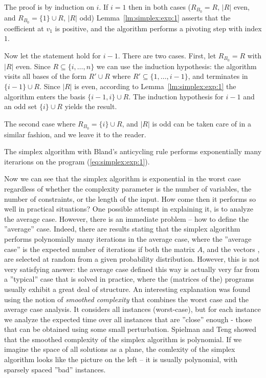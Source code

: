 \begin{dokaz}
  The proof is by induction on $i$. If $i=1$ then in both cases ($R_{B_0}=R$, $|R|$ even, 
  and  $R_{B_0}=\{1\}\cup R$, $|R|$ odd) Lemma~\ref{lm:simplex:exp:1} asserts that the coefficient
  at $v_1$ is positive, and the algorithm performs a pivoting step with index $1$.

  \noindent
  Now let the statement hold for $i-1$. There are two cases. First, let  $R_{B_0}=R$ with $|R|$ even.
  Since  $R\subseteq\{i,\ldots,n\}$ we can use the induction hypothesis: the algorithm visits all bases
  of the form $R'\cup R$ where $R'\subseteq\{1,\ldots,i-1\}$, and terminates in  $\{i-1\}\cup R$.
  Since $|R|$ is even, according to Lemma~\ref{lm:simplex:exp:1} the algorithm enters the basis
  $\{i-1,i\}\cup R$. The induction hypothesis for $i-1$ and an odd set $\{i\}\cup R$ yields the result.

  \noindent
  The second case where $R_{B_0}=\{i\}\cup R$, and $|R|$ is odd can be taken care of in a similar fashion,
  and we leave it to the reader.
\end{dokaz}

\begin{dosl}
  The simplex algorithm with Bland's anticycling rule performs exponentially many iterarions on the
  program
  (\ref{eq:simplex:exp:1}).
\end{dosl}


\noindent
Now we can see that the simplex algorithm is exponential in the worst case regardless of whether the 
complexity parameter is the number of variables, the number of constraints, or the length of the input. 
How come then it performs so well in practical situations? One possible attempt in explaining it, is to 
analyze the average case. However, there is an immediate problem -- how to define the ''average'' case.
Indeed, there are results stating that the simplex algorithm performs polynomially many iterations in the
average case, where the ''average case'' is the expected number of iterations if both the matrix $A$, and
the vectors ,  are selected at random from a given probability distribution.
However, this is not very satisfying answer: the average case defined this way is actually very far
from a ''typical'' case that is solved in practice, where the (matrices of the) programs usually exhibit
a great deal of structure. An interesting explanation was found using the notion of {\em smoothed complexity}
that combines the worst case and the average case analysis. 
It considers all instances (\ie worst-case), but for each instance we analyze the expected time over all
instances that are ''close'' enough - \ie those that can be obtained using some small perturbation. 
Spielman and Teng \cite{ST04} showed that the smoothed complexity of the simplex algorithm is polynomial.
If we  imagine the space of all solutions as a plane, the comlexity of the simplex algorithm looks like the
picture on the left -- it is usually polynomial, with sparsely spaced ''bad'' instances.


